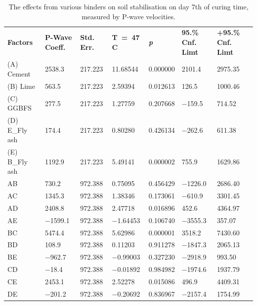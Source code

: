 \documentclass[materials,article,accept,pdftex,moreauthors]{Definitions/mdpi}
\begin{document}
\begin{table}[H]
\renewcommand{\arraystretch}{1.3}
\caption{The %
 effects from various binders on soil stabilisation on day 7th of curing time, measured by P-wave velocities.}\label{tab:1}
\begin{tabularx}{\textwidth}{CCCCCCC}
\toprule
			\textbf{Factors} & \textbf{P-Wave Coeff. }& \textbf{Std. Err.} & \textbf{T~=~47} \boldmath{$^\circ$}\textbf{C} & \textbf{\emph{{p}}} 
			 & \boldmath{$-$}\textbf{95.\%} \textbf{Cnf. Limt} & \textbf{+95.\%}\textbf{ Cnf. Limt} \\  
        (A) Cement & 2538.3 & 217.223 & 11.68544 & 0.000000 & 2101.4 & 2975.35 \\  
        (B) Lime & 563.5 & 217.223 & 2.59394 & 0.012613 & 126.5 & 1000.46 \\  
        (C) GGBFS & 277.5 & 217.223 & 1.27759 & 0.207668 & $-$159.5 & 714.52 \\ \midrule
        (D) E\_Fly ash & 174.4 & 217.223 & 0.80280 & 0.426134 & $-$262.6 & 611.38 \\  
        (E) B\_Fly ash & 1192.9 & 217.223 & 5.49141 & 0.000002 & 755.9 & 1629.86 \\  
        AB & 730.2 & 972.388 & 0.75095 & 0.456429 & $-$1226.0 & 2686.40 \\ \midrule
        AC & 1345.3 & 972.388 & 1.38346 & 0.173061 & $-$610.9 & 3301.45 \\  
        AD & 2408.8 & 972.388 & 2.47718 & 0.016896 & 452.6 & 4364.97 \\  
        AE & $-$1599.1 & 972.388 & $-$1.64453 & 0.106740 & $-$3555.3 & 357.07 \\  
        BC & 5474.4 & 972.388 & 5.62986 & 0.000001 & 3518.2 & 7430.60 \\  
        BD & 108.9 & 972.388 & 0.11203 & 0.911278 & $-$1847.3 & 2065.13 \\ \midrule
        BE & $-$962.7 & 972.388 & $-$0.99003 & 0.327230 & $-$2918.9 & 993.50 \\ \midrule
        CD & $-$18.4 & 972.388 & $-$0.01892 & 0.984982 & $-$1974.6 & 1937.79 \\  
        CE & 2453.1 & 972.388 & 2.52278 & 0.015086 & 496.9 & 4409.31 \\  
      DE & $-$201.2 & 972.388 & $-$0.20692 & 0.836967 & $-$2157.4 & 1754.99 \\ 
    

\end{tabularx}
\end{table}
\end{document}
